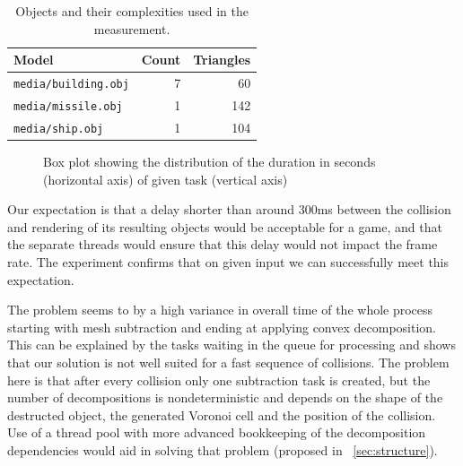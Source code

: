 \begin{table}
 	\centering
\begin{tabular}{lrr}
  Model & Count & Triangles \\
  \hline
  \texttt{media/building.obj} & 7 & 60 \\
  \texttt{media/missile.obj} & 1 & 142 \\
  \texttt{media/ship.obj} & 1 & 104
\end{tabular}
\caption{Objects and their complexities used in the measurement.}
	\label{tab:objects}
\end{table}

\begin{figure}
\centering
{}
\caption{Box plot showing the distribution of the duration in seconds (horizontal axis) of given task (vertical axis)}
\label{fig:boxtimes}
\end{figure}



Our expectation is that a delay shorter than around 300ms between the collision and rendering of its resulting objects would be acceptable for a game, and that the separate threads would ensure that this delay would not impact the frame rate. The experiment confirms that on given input we can successfully meet this expectation.

The problem seems to by a high variance in overall time of the whole process starting with mesh subtraction and ending at applying convex decomposition. This can be explained by the tasks waiting in the queue for processing and shows that our solution is not well suited for a fast sequence of collisions. The problem here is that after every collision only one subtraction task is created, but the number of decompositions is nondeterministic and depends on the shape of the destructed object, the generated Voronoi cell and the position of the collision. Use of a thread pool with more advanced bookkeeping of the decomposition dependencies would aid in solving that problem (proposed in ~\cref{sec:structure}).

